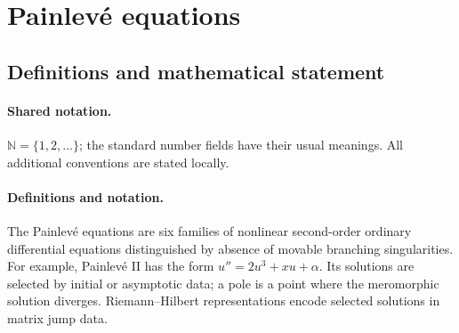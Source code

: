 \documentclass[11pt]{article}
\begin{document}
\section{Painlev\'e equations}\label{statement}

\subsection{Definitions and mathematical statement}

\paragraph{Shared notation.}$\mathbb N=\{1,2,\ldots\}$; the standard number fields have their usual meanings. All additional conventions are stated locally.


\paragraph{Definitions and notation.}The Painlevé equations are six families of nonlinear second-order ordinary differential equations distinguished by absence of movable branching singularities. For example, Painlevé II has the form $u''=2u^3+xu+\alpha$. Its solutions are selected by initial or asymptotic data; a pole is a point where the meromorphic solution diverges. Riemann--Hilbert representations encode selected solutions in matrix jump data.
\end{document}
